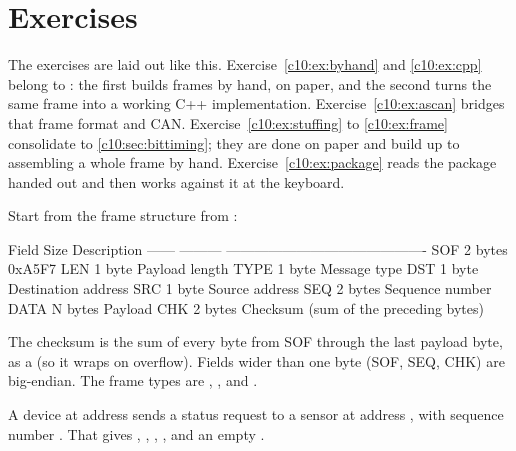
\section{Exercises}
\label{c10:sec:exercises}

\begin{aside}
The exercises are laid out like this. Exercise~\ref{c10:ex:byhand} and \ref{c10:ex:cpp} belong to
: the first builds frames by hand, on paper, and the second turns the same
frame into a working C++ implementation. Exercise~\ref{c10:ex:ascan} bridges that frame format and
CAN. Exercise~\ref{c10:ex:stuffing} to \ref{c10:ex:frame} consolidate  to
\ref{c10:sec:bittiming}; they are done on paper and build up to assembling a whole frame by hand.
Exercise~\ref{c10:ex:package} reads the  package handed out and then works against it
at the keyboard.
\end{aside}


\label{c10:ex:byhand}
Start from the frame structure from :

\begin{textdrawing}
Field  Size      Description
------ --------- -------------------------------------------
SOF    2 bytes   0xA5F7
LEN    1 byte    Payload length
TYPE   1 byte    Message type
DST    1 byte    Destination address
SRC    1 byte    Source address
SEQ    2 bytes   Sequence number
DATA   N bytes   Payload
CHK    2 bytes   Checksum (sum of the preceding bytes)
\end{textdrawing}

The checksum is the sum of every byte from SOF through the last payload byte, as a
 (so it wraps on overflow). Fields wider than one byte (SOF, SEQ, CHK) are
big-endian. The frame types are , ,  and
.

A device at address  sends a status request to a sensor at address , with
sequence number . That gives , , ,
, and an empty .

